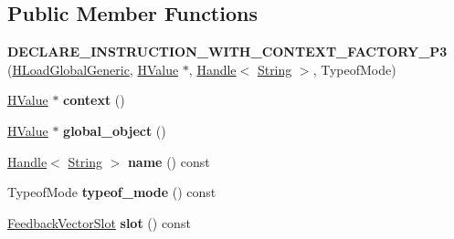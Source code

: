 \subsection*{Public Member Functions}
\begin{DoxyCompactItemize}
\item 
{\bfseries D\+E\+C\+L\+A\+R\+E\+\_\+\+I\+N\+S\+T\+R\+U\+C\+T\+I\+O\+N\+\_\+\+W\+I\+T\+H\+\_\+\+C\+O\+N\+T\+E\+X\+T\+\_\+\+F\+A\+C\+T\+O\+R\+Y\+\_\+\+P3} (\hyperlink{classv8_1_1internal_1_1_h_load_global_generic}{H\+Load\+Global\+Generic}, \hyperlink{classv8_1_1internal_1_1_h_value}{H\+Value} $\ast$, \hyperlink{classv8_1_1internal_1_1_handle}{Handle}$<$ \hyperlink{classv8_1_1internal_1_1_string}{String} $>$, Typeof\+Mode)\hypertarget{classv8_1_1internal_1_1_h_load_global_generic_acc08a5445bcf8f9817669280e1a83ce9}{}\label{classv8_1_1internal_1_1_h_load_global_generic_acc08a5445bcf8f9817669280e1a83ce9}

\item 
\hyperlink{classv8_1_1internal_1_1_h_value}{H\+Value} $\ast$ {\bfseries context} ()\hypertarget{classv8_1_1internal_1_1_h_load_global_generic_ac87aaf7069da45b49276c3934a6d5883}{}\label{classv8_1_1internal_1_1_h_load_global_generic_ac87aaf7069da45b49276c3934a6d5883}

\item 
\hyperlink{classv8_1_1internal_1_1_h_value}{H\+Value} $\ast$ {\bfseries global\+\_\+object} ()\hypertarget{classv8_1_1internal_1_1_h_load_global_generic_ada1c2500c3e6e25508b9e1779bd9d361}{}\label{classv8_1_1internal_1_1_h_load_global_generic_ada1c2500c3e6e25508b9e1779bd9d361}

\item 
\hyperlink{classv8_1_1internal_1_1_handle}{Handle}$<$ \hyperlink{classv8_1_1internal_1_1_string}{String} $>$ {\bfseries name} () const \hypertarget{classv8_1_1internal_1_1_h_load_global_generic_a0b43b76f74d257c55ac5a704959fe45c}{}\label{classv8_1_1internal_1_1_h_load_global_generic_a0b43b76f74d257c55ac5a704959fe45c}

\item 
Typeof\+Mode {\bfseries typeof\+\_\+mode} () const \hypertarget{classv8_1_1internal_1_1_h_load_global_generic_afd01d7741553d68a0cd4a8400b96c8f0}{}\label{classv8_1_1internal_1_1_h_load_global_generic_afd01d7741553d68a0cd4a8400b96c8f0}

\item 
\hyperlink{classv8_1_1internal_1_1_feedback_vector_slot}{Feedback\+Vector\+Slot} {\bfseries slot} () const \hypertarget{classv8_1_1internal_1_1_h_load_global_generic_a620cafaf64b4d2813d62158b573c5951}{}\label{classv8_1_1internal_1_1_h_load_global_generic_a620cafaf64b4d2813d62158b573c5951}


\end{DoxyCompactItemize}
